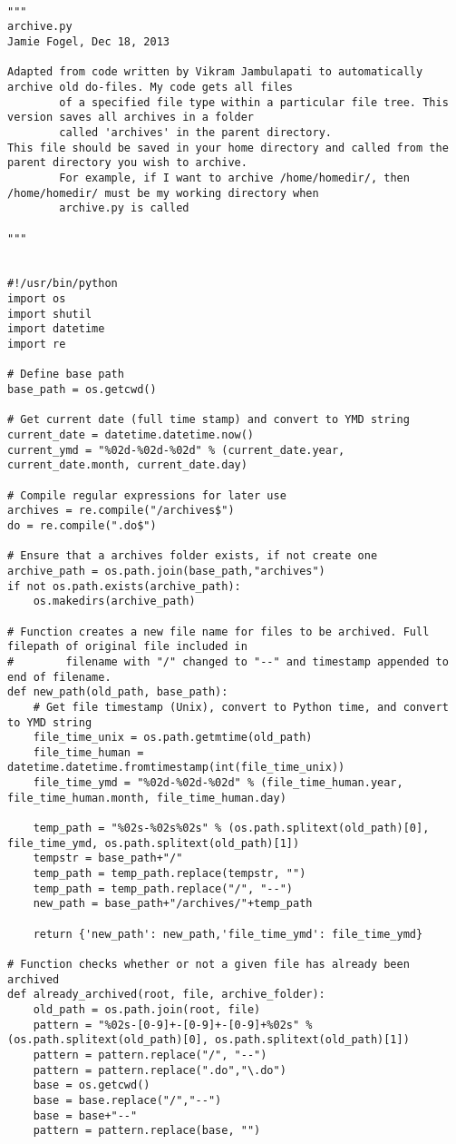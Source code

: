\documentclass[11pt]{article}
\begin{document}
\begin{lstlisting}

"""
archive.py
Jamie Fogel, Dec 18, 2013

Adapted from code written by Vikram Jambulapati to automatically archive old do-files. My code gets all files
        of a specified file type within a particular file tree. This version saves all archives in a folder
        called 'archives' in the parent directory.
This file should be saved in your home directory and called from the parent directory you wish to archive.
        For example, if I want to archive /home/homedir/, then /home/homedir/ must be my working directory when
        archive.py is called

"""


#!/usr/bin/python
import os
import shutil
import datetime
import re

# Define base path
base_path = os.getcwd()

# Get current date (full time stamp) and convert to YMD string
current_date = datetime.datetime.now()
current_ymd = "%02d-%02d-%02d" % (current_date.year, current_date.month, current_date.day)

# Compile regular expressions for later use
archives = re.compile("/archives$")
do = re.compile(".do$")

# Ensure that a archives folder exists, if not create one
archive_path = os.path.join(base_path,"archives")
if not os.path.exists(archive_path):
    os.makedirs(archive_path)

# Function creates a new file name for files to be archived. Full filepath of original file included in
#        filename with "/" changed to "--" and timestamp appended to end of filename.
def new_path(old_path, base_path):
    # Get file timestamp (Unix), convert to Python time, and convert to YMD string
    file_time_unix = os.path.getmtime(old_path)
    file_time_human = datetime.datetime.fromtimestamp(int(file_time_unix))
    file_time_ymd = "%02d-%02d-%02d" % (file_time_human.year, file_time_human.month, file_time_human.day)

    temp_path = "%02s-%02s%02s" % (os.path.splitext(old_path)[0], file_time_ymd, os.path.splitext(old_path)[1])
    tempstr = base_path+"/"
    temp_path = temp_path.replace(tempstr, "")
    temp_path = temp_path.replace("/", "--")
    new_path = base_path+"/archives/"+temp_path

    return {'new_path': new_path,'file_time_ymd': file_time_ymd}

# Function checks whether or not a given file has already been archived
def already_archived(root, file, archive_folder):
    old_path = os.path.join(root, file)
    pattern = "%02s-[0-9]+-[0-9]+-[0-9]+%02s" % (os.path.splitext(old_path)[0], os.path.splitext(old_path)[1])
    pattern = pattern.replace("/", "--")
    pattern = pattern.replace(".do","\.do")
    base = os.getcwd()
    base = base.replace("/","--")
    base = base+"--"
    pattern = pattern.replace(base, "")


\end{lstlisting}
\end{document}
